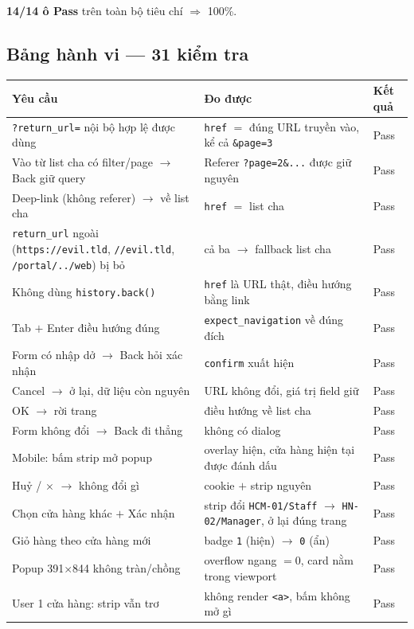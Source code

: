 \textbf{14/14 ô Pass} trên toàn bộ tiêu chí $\Rightarrow$ 100\%.

\subsection{Bảng hành vi --- 31 kiểm tra}

\begin{longtable}{@{}p{6.6cm}p{5.1cm}p{2.6cm}@{}}
\toprule
\textbf{Yêu cầu} & \textbf{Đo được} & \textbf{Kết quả} \\
\midrule
\endhead
\texttt{?return\_url=} nội bộ hợp lệ được dùng & \texttt{href} $=$ đúng URL truyền vào, kể cả \texttt{\&page=3} & Pass \\
Vào từ list cha có filter/page $\rightarrow$ Back giữ query & Referer \texttt{?page=2\&...} được giữ nguyên & Pass \\
Deep-link (không referer) $\rightarrow$ về list cha & \texttt{href} $=$ list cha & Pass \\
\texttt{return\_url} ngoài (\texttt{https://evil.tld}, \texttt{//evil.tld}, \texttt{/portal/../web}) bị bỏ & cả ba $\rightarrow$ fallback list cha & Pass \\
Không dùng \texttt{history.back()} & \texttt{href} là URL thật, điều hướng bằng link & Pass \\
Tab $+$ Enter điều hướng đúng & \texttt{expect\_navigation} về đúng đích & Pass \\
Form có nhập dở $\rightarrow$ Back hỏi xác nhận & \texttt{confirm} xuất hiện & Pass \\
Cancel $\rightarrow$ ở lại, dữ liệu còn nguyên & URL không đổi, giá trị field giữ & Pass \\
OK $\rightarrow$ rời trang & điều hướng về list cha & Pass \\
Form không đổi $\rightarrow$ Back đi thẳng & không có dialog & Pass \\
Mobile: bấm strip mở popup & overlay hiện, cửa hàng hiện tại được đánh dấu & Pass \\
Huỷ / $\times$ $\rightarrow$ không đổi gì & cookie $+$ strip nguyên & Pass \\
Chọn cửa hàng khác $+$ Xác nhận & strip đổi \texttt{HCM-01/Staff} $\rightarrow$ \texttt{HN-02/Manager}, ở lại đúng trang & Pass \\
Giỏ hàng theo cửa hàng mới & badge \texttt{1} (hiện) $\rightarrow$ \texttt{0} (ẩn) & Pass \\
Popup 391$\times$844 không tràn/chồng & overflow ngang $=0$, card nằm trong viewport & Pass \\
User 1 cửa hàng: strip vẫn trơ & không render \texttt{<a>}, bấm không mở gì & Pass \\
\bottomrule
\end{longtable}

